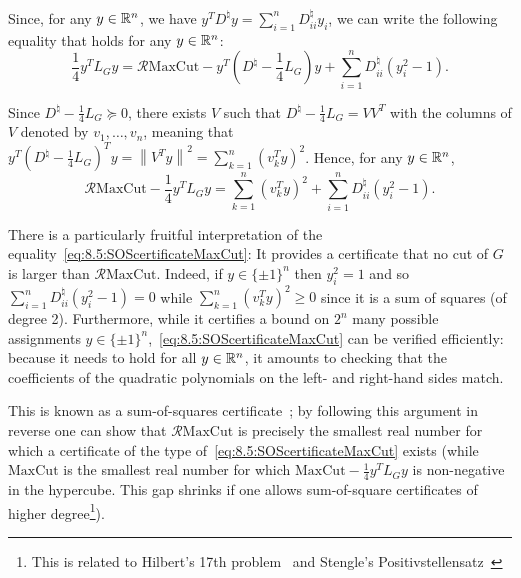 Since, for any $y\in\mathbb{R}^n$, we have $y^TD^\natural y=\sum_{i=1}^n D^\natural_{ii}y_i$, we can write the following equality that holds for any $y\in\mathbb{R}^n$:
\begin{equation}\label{eq:8:SOScertificateMaxCut}
\frac14 y^TL_Gy =  \mathcal{R}\mathrm{MaxCut} - y^T\left( D^{\natural} - \frac14L_G\right)y + \sum_{i=1}^n D_{ii}^{\natural}\left( y_i^2 - 1 \right).
\end{equation}

Since $D^{\natural} - \frac14L_G\succeq 0$, there exists $V$ such that $D^{\natural} - \frac14L_G = VV^T$ with the columns of $V$ denoted by $v_1,\dots,v_n$, meaning that $y^T\left( D^{\natural} - \frac14L_G\right)^Ty = \left\| V^T y\right\|^2 = \sum_{k=1}^n (v_k^Ty)^2$. Hence, for any $y\in\mathbb{R}^n$,
\begin{equation}\label{eq:8.5:SOScertificateMaxCut}
\mathcal{R}\mathrm{MaxCut} - \frac14 y^TL_Gy   = \sum_{k=1}^n (v_k^Ty)^2+ \sum_{i=1}^n D_{ii}^{\natural}\left( y_i^2 - 1 \right).
\end{equation}

There is a particularly fruitful interpretation of the equality~\eqref{eq:8.5:SOScertificateMaxCut}: It provides a certificate that no cut of $G$ is larger than $\mathcal{R}\mathrm{MaxCut}$. Indeed, if $y\in\{\pm1\}^n$ then $y_i^2=1$ and so $\sum_{i=1}^n D_{ii}^{\natural}\left( y_i^2 - 1 \right)=0$ while $\sum_{k=1}^n (v_k^Ty)^2\geq 0$ since it is a sum of squares (of degree 2). Furthermore, while it certifies a bound on $2^n$ many possible assignments $y\in\{\pm1\}^n$,~\eqref{eq:8.5:SOScertificateMaxCut} can be verified efficiently: because it needs to hold for all $y\in\mathbb{R}^n$, it amounts to checking that the coefficients of the quadratic polynomials on the left- and right-hand sides match.


This is known as a sum-of-squares certificate~\cite{Barak_Steurer_surveyICM,Barak_SOS_LectureNotes,Parrilo_thesis_SOS,Lassere_01_SOS,Shor_87_SOS,Nesterov_00_SOS}; by following this argument in reverse one can show that $\mathcal{R}\mathrm{MaxCut}$ is precisely the smallest real number for which a certificate of the type of~\eqref{eq:8.5:SOScertificateMaxCut} exists (while $\mathrm{MaxCut}$ is the smallest real number for which $\mathrm{MaxCut} - \frac14 y^TL_Gy$ is non-negative in the hypercube. This gap shrinks if one allows sum-of-square certificates of higher degree\footnote{This is related to Hilbert's 17th problem~\cite{Schmudgen_Hilbert17} and Stengle's Positivstellensatz~\cite{Stengle_Positivstellensatz} }).

